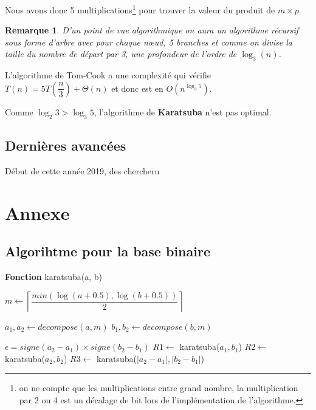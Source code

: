 \documentclass[11pt,french]{article}
\theoremstyle{plain}
\newtheorem*{remarque}{Remarque}
\newcommand{\x}{\times}
\begin{document}
 Nous avons donc 5 multiplications\footnote{on ne compte que les multiplications entre grand nombre, la multiplication par 2 ou 4 est un décalage de bit lors de l'implémentation de l'algorithme.} pour trouver la valeur du produit de $m\times p$.
 \begin{remarque}
     D'un point de vue algorithmique on aura un algorithme récursif sous forme d'arbre avec pour chaque nœud, 5 branches et comme on divise la taille du nombre de départ par 3, une profondeur de l'ordre de $\log_3(n)$.
 \end{remarque}
 \begin{propriete}
     L'algorithme de Tom-Cook a une complexité qui vérifie $ T(n)=5T\left( \dfrac{n}{3}\right) + \Theta(n) $ et donc est en $O\left( n^{\log_3 5}\right) $.
  \end{propriete}
Comme $\log_2 3 >\log_3 5$, l'algorithme de \textbf{Karatsuba} n'est pas optimal.

\subsection{Dernières avancées}
Début de cette année 2019, des chercheru

\newpage

\section*{Annexe}
\subsection*{Algorihtme pour la base binaire}
\begin{center}
    \begin{minipage}{10cm}
        \begin{algorithm}[H]
            \caption{\textbf{Fonction} karatsuba(a, b)}
            \vspace{1em}
            
            $m  \gets  \left\lceil \dfrac{min\left( \log(a+0.5), \log(b+0.5)\right) }{2}  \right\rceil$\;
            
            $a_1,a_2 \gets decompose(a, m)$ \;
            $b_1, b_2 \gets  decompose(b, m)$ \;
            
            $\epsilon = signe(a_2-a_1)\x signe(b_2-b_1)$\;
            $R1  \gets $ karatsuba($a_1,b_1$) \;
            $R2 \gets  $ karatsuba($a_2,b_2$)\;
            $R3  \gets $ karatsuba($|a_2-a_1|,|b_2-b_1|$)\;
            
            
            \Retour{ $R1 << {2\times m } + (R1+R2-\epsilon \x R3 ) <<  { m} + R2$}
            
        \end{algorithm}
    \end{minipage}
\end{center}
\end{document}
